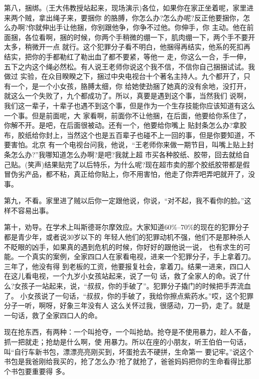 \documentclass[11pt,a4paper,onecolumn]{article}
\begin{document}
第八，捆绑。(王大伟教授站起来，现场演示)各位，如果你在家正坐着呢，家里进来两个贼，拿出绳子来，要捆你
的胳膊，你怎么办?怎么办呢?反正他要捆你，怎么办啊?你就伸出手让他捆，你别跟他争，你争不过他。你伸手，你
主动。他在前面捆，各位看啊，捆的时候，你两个手稍微的绷一下，肌肉绷一下，两个手不要开太多，稍微开一点
就行。这个犯罪分子看不明白，他捆得再结实，他系的死扣再结实，把你的手都勒红了勒出血了都不要紧，等他一
走，你这么一合，手一伸，五下之内这个绳必然松。有人说王老师你说这个我不信，不信你自己捆捆试试。我做过
实验，在众目睽睽之下，捆过中央电视台十个著名主持人。九个都开了，只有一个，是一个小女孩，胳膊太细，你
给她使劲捆了她真的没有余地，没打开，就这么一个失败了，九个都成功了。所以，真要是遇到这个事，当然我们
说啊，我们这一辈子，十辈子也遇不到这个事，但是作为一个生存技能你应该知道有这么一个事。但是前面呢，大
家看啊，前面你不让他捆，在后面，他要给你系住了，你解不开。是吧，在后面很被动。还有一个，他要给你嘴上
贴封条怎么办?拿胶布，胶纸给你封上，当然这个也是五百辈子也碰不上一回的事，但是你要知道，不要害怕。北京
有一个电视台问我，他说，``王老师你来做一期节目，叫嘴上贴上封条怎么办?''我哪知道怎么办啊?是吧?我就上超
市买各种胶纸、胶带，回去就给自己贴。(笑声)结果贴完了以后特乐，为什么呢?现在超市卖的那个胶纸胶带都是假
冒伪劣产品，都不粘，真正给你贴上，你不用害怕，他走了你弄吧弄吧就开了，没事。

第九，不看。家里进了贼以后你一定跟他说，你说，``对不起，我不看你的脸。''这样不容易出事。

第十，劝导。在学术上叫斯德哥尔摩效应。大家知道60\%--70\%的现在的犯罪分子都是青少年，或者说30岁以下的
年轻人他们的犯罪动机不强，他们不是那种杀人不眨眼的凶手，如果真的遇到危机的时候，你好好的跟他说一说，
也有求生的可能。一个真实的案例，全家四口人在家看电视，进来一个犯罪分子，手上拿着刀。三年了，他没有得
到老板的工资，他要报复社会，拿着刀。结果一进来，四口人在这儿看电视，一个九岁小女孩站起来，说了一句
话，救了全家人的命。说了什么?女孩子一站起来，说，``叔叔，你的手破了''。犯罪分子撬门的时候把手弄流血了。
小女孩说了一句话，``叔叔，你的手破了，我给你擦点紫药水。''哎，这个犯罪分子一听，啊呀，好象三年没有人
这么关怀过我，很感动，刀一扔，走了。就是一句话，救了全家四口人的命。

现在抢东西，有两种：一个叫抢夺，一个叫抢劫。抢夺是不使用暴力，趁人不备，抓一把就走；抢劫是什么啊，使
用暴力。所以在座的小朋友，听王伯伯一句话，叫``自行车新书包，漂漂亮亮刚买到，坏蛋抢去不硬拼，生命第一
要记牢。''说这个书包是我爸刚给我买的，抢了怎么办?抢了就抢了，爸爸妈妈把你的生命看得比那个书包要重要得
多。
\end{document}
